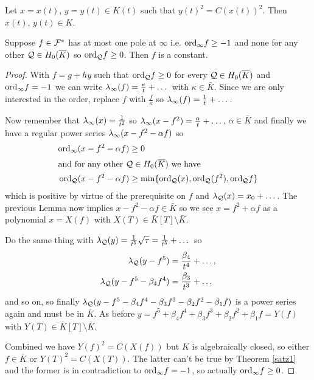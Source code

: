\documentclass[english,11pt,a4paper]{article}
\begin{document}
\begin{theorem}\label{satz1}
  Let $x = x(t)$, $y = y(t) \in K(t)$ such that $y(t)^2 = C(x(t))^2$. Then $x(t)$, $y(t) \in K$.
\end{theorem}

\begin{lemma}
	Suppose $f \in \mathcal{F}^*$ has at most one pole at $\infty$ i.e. $\text{ord}_{\infty} f \geq -1$ and none for any other $\mathcal{Q} \in H_0(\overline K)$ so $\text{ord}_{\mathcal{Q}} f \geq 0$. Then $f$ is a constant.

	\begin{proof}
		With $f = g+hy$ such that $\text{ord}_{\mathcal{Q}} f \geq 0$ for every $\mathcal{Q} \in H_0(\overline K)$ and $\text{ord}_{\infty} f = -1$ we can write $\lambda_{\infty} (f) = \frac \kappa t + \dots$ with $\kappa \in \bar K$. Since we are only interested in the order, replace $f$ with $\frac f \kappa$ so $\lambda_{\infty} (f) = \frac 1 t + \dots$.

		Now remember that $\lambda_{\infty} (x) = \frac{1}{t^2}$ so $\lambda_{\infty} (x - f^2) = \frac \alpha t + \dots$, $\alpha \in \bar K$ and finally we have a regular power series $\lambda_{\infty} (x - f^2 - \alpha f)$ so
		\begin{align*}
		  \text{ord}_{\infty} (x - f^2 - \alpha f) &\geq 0\\
		\intertext{and for any other $\mathcal{Q} \in H_0(\overline K)$ we have}
		  \text{ord}_{\mathcal{Q}} (x - f^2 - \alpha f) &\geq \min \{ \text{ord}_{\mathcal{Q}} (x) , \text{ord}_{\mathcal{Q}} (f^2) , \text{ord}_{\mathcal{Q}} f \}
		\end{align*}
		which is positive by virtue of the prerequisite on $f$ and $\lambda_{\mathcal{Q}}(x) = x_0 + \dots$. The previous Lemma now implies $x - f^2 - \alpha f \in \bar K$ so we see $x = f^2 + \alpha f$ as a polynomial $x = X(f)$ with $X(T) \in \bar K[T] \setminus \bar K$.

		Do the same thing with $\lambda_{\mathcal{Q}}(y) = \frac{1}{t^5}\sqrt \tau = \frac{1}{t^5} + \dots$ so
		\begin{align*}
		  \lambda_{\mathcal{Q}} (y - f^5) &= \frac{\beta_4}{t^4} + \dots,\\
		  \lambda_{\mathcal{Q}} (y - f^5 - \beta_4 f^4) &= \frac{\beta_3}{t^3} + \dots
		\end{align*}
		and so on, so finally $\lambda_{\mathcal{Q}} (y - f^5 - \beta_4 f^4 - \beta_3 f^3 - \beta_2 f^2 - \beta_1 f)$ is a power series again and must be in $\bar K$. As before $y = f^5 + \beta_4 f^4 + \beta_3 f^3 + \beta_2 f^2 + \beta_1 f = Y(f)$ with $Y(T)\in \bar K[T] \setminus \bar K$.

		Combined we have $Y(f)^2 = C(X(f))$ but $K$ is algebraically closed, so either $f \in \bar K$ or $Y(T)^2 = C(X(T))$. The latter can't be true by Theorem \ref{satz1} and the former is in contradiction to $\text{ord}_{\infty} f = -1$, so actually $\text{ord}_{\infty} f \geq 0$.%
	\end{proof}
\end{lemma}
\end{document}
